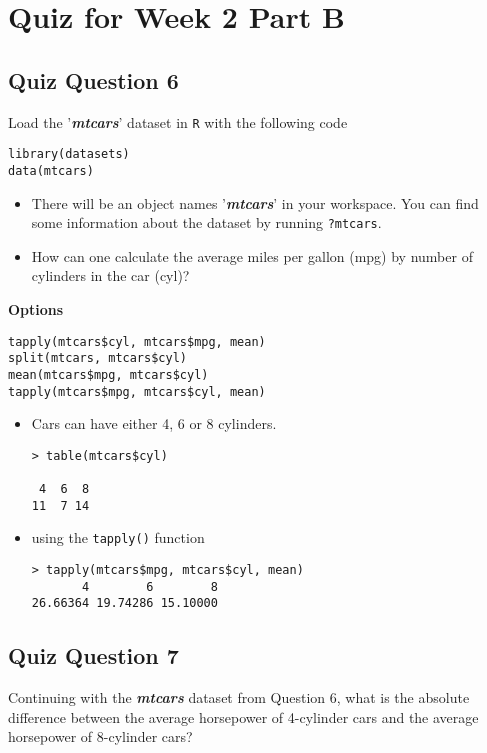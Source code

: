 \documentclass[12pt]{article}
\begin{document}
\section*{Quiz for Week 2 Part B}

\subsection*{Quiz Question 6}
Load the '\textit{\textbf{mtcars}}' dataset in \texttt{R} with the following code

\begin{framed}
\begin{verbatim}
library(datasets)
data(mtcars)
\end{verbatim}
\end{framed}

\begin{itemize}
\item There will be an object names '\textit{\textbf{mtcars}}' in your workspace. You can find some information about the dataset by running
\texttt{?mtcars}.

\item How can one calculate the average miles per gallon (mpg) by number of cylinders in the car (cyl)?
\end{itemize}
\textbf{Options}
\begin{verbatim}
tapply(mtcars$cyl, mtcars$mpg, mean)
split(mtcars, mtcars$cyl)
mean(mtcars$mpg, mtcars$cyl)
tapply(mtcars$mpg, mtcars$cyl, mean)
\end{verbatim}

\begin{itemize}
\item Cars can have either 4, 6 or 8 cylinders.
\begin{verbatim}
> table(mtcars$cyl)

 4  6  8 
11  7 14 
\end{verbatim}
\item using the \texttt{tapply()} function
\begin{verbatim}
> tapply(mtcars$mpg, mtcars$cyl, mean)
       4        6        8 
26.66364 19.74286 15.10000
\end{verbatim}
\end{itemize}
\newpage
\subsection*{Quiz Question 7}
Continuing with the \textit{\textbf{mtcars}} dataset from Question 6, what is the absolute difference between the average horsepower of 4-cylinder cars and the average horsepower of 8-cylinder cars?
\end{document}
